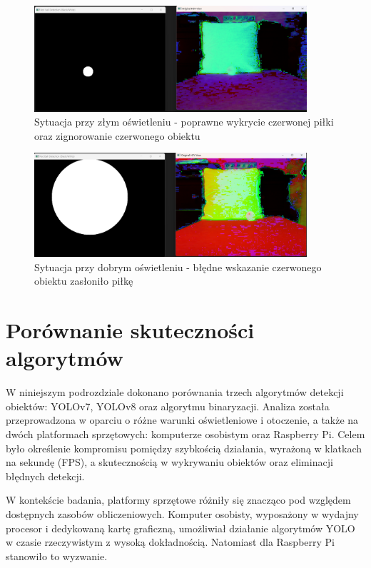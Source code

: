 \documentclass[a4paper,twoside,12pt]{book}
\begin{document}
\begin{figure}[h]
    \centering
    \includegraphics[width=0.9\textwidth]{Images/Porownanie/Binaryzacja/Zrzut ekranu 2025-01-02 193817.png}
    \caption{Sytuacja przy złym oświetleniu - poprawne wykrycie czerwonej piłki oraz zignorowanie czerwonego obiektu}
    \label{fig:Wykrycie piłki10}
\end{figure}
\begin{figure}[h]
    \centering
    \includegraphics[width=0.9\textwidth]{Images/Porownanie/Binaryzacja/Zrzut ekranu 2025-01-02 193917.png}
    \caption{Sytuacja przy dobrym oświetleniu - błędne wskazanie czerwonego obiektu zasłoniło piłkę}
    \label{fig:Wykrycie piłki11}
\end{figure}

\newpage
\section{Porównanie skuteczności algorytmów}

W niniejszym podrozdziale dokonano porównania trzech algorytmów detekcji obiektów: YOLOv7, YOLOv8 oraz algorytmu binaryzacji. Analiza została przeprowadzona w oparciu o różne warunki oświetleniowe i otoczenie, a także na dwóch platformach sprzętowych: komputerze osobistym oraz Raspberry Pi. Celem było określenie kompromisu pomiędzy szybkością działania, wyrażoną w klatkach na sekundę (FPS), a skutecznością w wykrywaniu obiektów oraz eliminacji błędnych detekcji.

W kontekście badania, platformy sprzętowe różniły się znacząco pod względem dostępnych zasobów obliczeniowych. Komputer osobisty, wyposażony w wydajny procesor i dedykowaną kartę graficzną, umożliwiał działanie algorytmów YOLO w czasie rzeczywistym z wysoką dokładnością. Natomiast dla Raspberry Pi stanowiło to wyzwanie.
\end{document}
